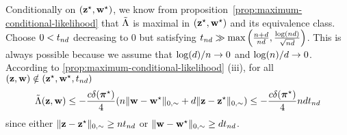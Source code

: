 \proofbegin
Conditionally on $(\mathbf{z}^\star, \mathbf{w}^\star)$, we know from
proposition~\ref{prop:maximum-conditional-likelihood} that
$\tilde{\Lambda}$ is maximal in $(\mathbf{z}^\star, \mathbf{w}^\star)$ and its equivalence
class. Choose $0 < t_{nd}$ decreasing to $0$ but satisfying $t_{nd} \gg \max\left(\frac{n+d}{nd}, \frac{\log(nd)}{\sqrt{nd}}\right)$. This is always possible because we assume that $\log(d)/n\rightarrow 0$ and $\log(n)/d\rightarrow 0$. According to \ref{prop:maximum-conditional-likelihood} (iii), for all $(\mathbf{z}, \mathbf{w}) \notin (\mathbf{z}^\star, \mathbf{w}^\star, t_{nd})$
\begin{equation}
\label{eqn:maxlambdatilde}
\Lambtilde(\bz, \bw) \leq - \frac{c \delta(\bals)}{4}(\n \|\bw - \bws\|_{0, \sim} + \dd \|\bz - \bzs\|_{0, \sim}) \leq - \frac{c \delta(\bals)}{4} \n\dd\tnd
\end{equation}
since either $\|\mathbf{z} - \mathbf{z}^\star\|_{0, \sim} \geq n t_{nd}$ or $\|\mathbf{w} - \mathbf{w}^\star\|_{0, \sim} \geq d t_{nd}$. 

% 
% 
% 

